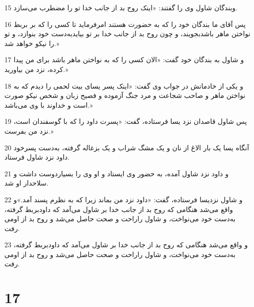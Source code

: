 \par 15 وبندگان شاول وی را گفتند: «اینک روح بد از جانب خدا تو را مضطرب می‌سازد.
\par 16 پس آقای ما بندگان خود را که به حضورت هستند امرفرماید تا کسی را که بر بربط نواختن ماهر باشدبجویند، و چون روح بد از جانب خدا بر تو بیایدبه‌دست خود بنوازد، و تو را نیکو خواهد شد.»
\par 17 و شاول به بندگان خود گفت: «الان کسی را که به نواختن ماهر باشد برای من پیدا کرده، نزد من بیاورید.»
\par 18 و یکی از خادمانش در جواب وی گفت: «اینک پسر یسای بیت لحمی را دیدم که به نواختن ماهر و صاحب شجاعت و مرد جنگ آزموده و فصیح زبان و شخص نیکو صورت است و خداوند با وی می‌باشد.»
\par 19 پس شاول قاصدان نزد یسا فرستاده، گفت: «پسرت داود را که با گوسفندان است، نزد من بفرست.»
\par 20 آنگاه یسا یک بار الاغ از نان و یک مشگ شراب و یک بزغاله گرفته، به‌دست پسرخود داود نزد شاول فرستاد.
\par 21 و داود نزد شاول آمده، به حضور وی ایستاد و او وی را بسیاردوست داشت و سلاحدار او شد.
\par 22 و شاول نزدیسا فرستاده، گفت: «داود نزد من بماند زیرا که به نظرم پسند آمد.»و واقع می‌شد هنگامی که روح بد از جانب خدا بر شاول می‌آمد که داودبربط گرفته، به‌دست خود می‌نواخت، و شاول راراحت و صحت حاصل می‌شد و روح بد از اومی رفت.
\par 23 و واقع می‌شد هنگامی که روح بد از جانب خدا بر شاول می‌آمد که داودبربط گرفته، به‌دست خود می‌نواخت، و شاول راراحت و صحت حاصل می‌شد و روح بد از اومی رفت.
 
\chapter{17}


